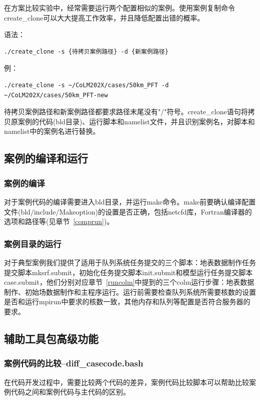 在方案比较实验中，经常需要运行两个配置相似的案例。使用案例复制命令create\_clone可以大大提高工作效率，并且降低配置出错的概率。

语法：
\begin{lstlisting}
./create_clone -s {待拷贝案例路径} -d {新案例路径}
\end{lstlisting}

例：
\begin{lstlisting}
./create_clone -s ~/CoLM202X/cases/50km_PFT -d ~/CoLM202X/cases/50km_PFT-new
\end{lstlisting}

待拷贝案例路径和新案例路径都要求路径末尾没有"/"符号。create\_clone语句将拷贝原案例的代码(bld目录)、运行脚本和namelist文件，并且识别案例名，对脚本和namelist中的案例名进行替换。

\subsection{案例的编译和运行}
\subsubsection{案例的编译}
对于案例代码的编译需要进入bld目录，并运行make命令。make前要确认编译配置文件(bld$\slash$include$\slash$Makeoption)的设置是否正确，包括netcfd库，Fortran编译器的选项和路径等(见章节~\ref{comprun})。

\subsubsection{案例目录的运行}
对于典型案例我们提供了适用于队列系统任务提交的三个脚本：地表数据制作任务提交脚本mksrf.submit，初始化任务提交脚本init.submit和模型运行任务提交脚本case.submit，他们分别对应章节~\ref{runcolm}中提到的三个colm运行步骤：地表数据制作、初始场数据制作和主程序运行。运行前需要检查队列系统所需要核数的设置是否和运行mpirun中要求的核数一致，其他内存和队列等配置是否符合服务器的要求。

\subsection{辅助工具包高级功能}

\subsubsection{案例代码的比较--diff\_casecode.bash}

在代码开发过程中，需要比较两个代码的差异，案例代码比较脚本可以帮助比较案例代码之间和案例代码与主代码的区别。

